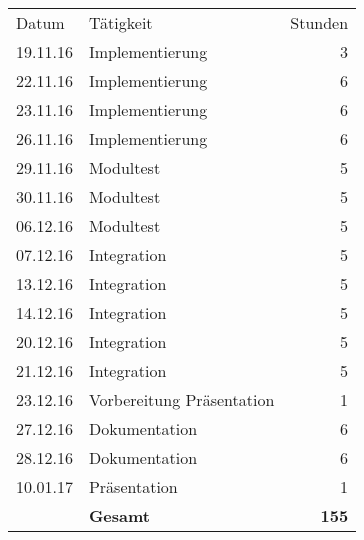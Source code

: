 \begin{minipage}{0.5\textwidth}
    \begin{tabular}{llr}
       Datum& Tätigkeit&Stunden\\
       19.11.16&Implementierung&3 \\
       22.11.16&Implementierung&6 \\
       23.11.16&Implementierung&6 \\
       26.11.16&Implementierung&6 \\
       29.11.16&Modultest&5 \\
       30.11.16&Modultest&5 \\
       06.12.16&Modultest&5 \\
       07.12.16&Integration&5 \\
       13.12.16&Integration&5 \\
       14.12.16&Integration&5 \\      
       20.12.16&Integration&5 \\
       21.12.16&Integration&5 \\
       23.12.16&Vorbereitung Präsentation&1 \\
       27.12.16&Dokumentation&6 \\
       28.12.16&Dokumentation&6 \\
       10.01.17&Präsentation&1 \\
       &\textbf{Gesamt}&\textbf{155}
    \end{tabular}
\end{minipage}